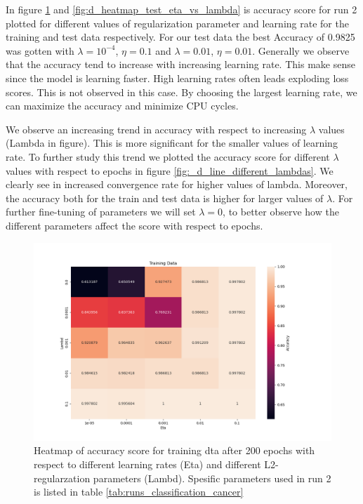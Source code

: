 

In figure \ref{fig:d_heatmap_train_eta_vs_lambda} and
\ref{fig:d_heatmap_test_eta_vs_lambda} is accuracy score for run 2 plotted for
different values of regularization parameter and learning rate for the training
and test data respectively. For our test data the best Accuracy of 0.9825 was
gotten with $\lambda = 10^{-4}$, $\eta = 0.1$ and $\lambda = 0.01$, $\eta =
0.01$. Generally we observe that the accuracy tend to increase with increasing
learning rate. This make sense since the model is learning faster. High
learning rates often leads exploding loss scores. This is not observed in this
case. By choosing the largest learning rate, we can maximize the accuracy and
minimize CPU cycles. 

We observe an increasing trend in accuracy with respect to increasing $\lambda $
values (Lambda in figure). This is more significant for the smaller values
of learning rate. To further study this trend we plotted the accuracy score
for different $\lambda $ values with respect to epochs in figure
\ref{fig:_d_line_different_lambdas}. We clearly see in increased convergence
rate for higher values of lambda. Moreover, the accuracy both for the train and
test data is higher for larger values of $\lambda $. For further fine-tuning of
parameters we will set $\lambda = 0$, to better observe how the different
parameters affect the score with respect to epochs. 



\begin{figure}[H]
    \centering
    \includegraphics[width=\textwidth]{Figures/PartD/d_heatmap_train_eta_vs_lambda}
    \caption{Heatmap of accuracy score for training dta after 200 epochs with
    respect to different learning rates (Eta) and different L2-regularzation
    parameters (Lambd).   Spesific parameters used in run 2 is listed in table
\ref{tab:runs_classification_cancer}   }  
    \label{fig:d_heatmap_train_eta_vs_lambda}  
\end{figure}

